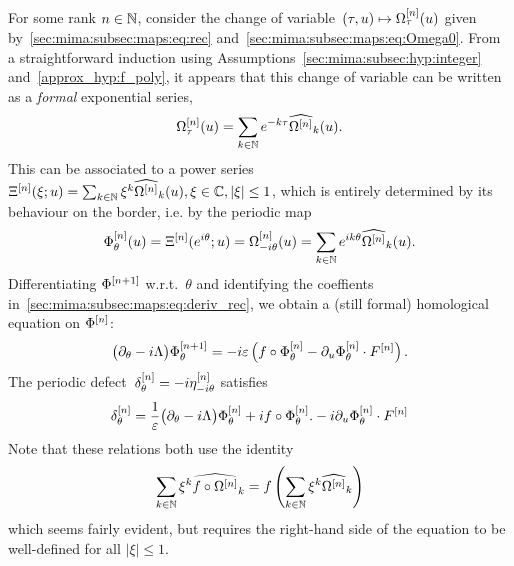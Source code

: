 For some rank $n\in \mathbb{N}$, consider the change of variable~$(\tau, u)
\mapsto \Omega^{[n]}_{\tau}(u)$ given
by~\eqref{sec:mima:subsec:maps:eq:rec}
and~\eqref{sec:mima:subsec:maps:eq:Omega0}. From a straightforward
induction using Assumptions~\ref{sec:mima:subsec:hyp:integer}
and~\ref{approx_hyp:f_poly}, it appears that this change of variable can
be written as a \textit{formal} exponential series, 
\begin{equation*}
	\Omega^{[n]}_{\tau}(u) = \sum_{k \in \mathbb{N}} e^{-k \tau}
  \widehat{\Omega^{[n]}}_k (u) . 
\end{equation*}
This can be associated to  a power series $\Xi^{[n]}(\xi ; u) = \sum_{k
\in \mathbb{N}} \xi^k \widehat{\Omega^{[n]}}_k(u), \xi \in \mathbb{C}, |\xi| \leq 1$,
which is entirely determined by its behaviour on the border, i.e. by the
periodic map
\begin{equation}
  \Phi^{[n]}_{\theta}(u) = \Xi^{[n]}(e^{i\theta}; u) 
  = \Omega^{[n]}_{-i\theta}(u)
  = \sum_{k \in \mathbb{N}} e^{ik\theta} \widehat{\Omega^{[n]}}_k (u) .
\end{equation}
Differentiating $\Phi^{[n+1]}$ w.r.t.~$\theta$ and identifying the
coeffients in~\eqref{sec:mima:subsec:maps:eq:deriv_rec}, we obtain a
(still formal) homological equation on $\Phi^{[n]}$:
\begin{equation}
  \big( \partial_{\theta} - i \Lambda \big) \Phi^{[n+1]}_{\theta}
  = -i \varepsilon \left( f \circ \Phi^{[n]}_{\theta} - \partial_{u} \Phi^{[n]}_{\theta}
  \cdot F^{[n]} \right) .
\end{equation}
The periodic defect~$\delta^{[n]}_{\theta} = -i \eta^{[n]}_{-i\theta}$ 
satisfies 
\begin{equation} \label{sec:proofs:subsec:bounds:eq:def_delta}
  \delta^{[n]}_{\theta} 
  = \frac{1}{\varepsilon} \big( \partial_{\theta} - i\Lambda \big) \Phi^{[n]}_{\theta} 
  + i f \circ \Phi^{[n]}_{\theta} . 
  - i \partial_{u} \Phi^{[n]}_{\theta} \cdot F^{[n]} 
\end{equation}
Note that these relations both use the identity 
\begin{equation} \label{sec:proofs:subsec:bounds:eq:commut_xi}
  \sum_{k \in \mathbb{N}} \xi^k \widehat{f \circ \Omega^{[n]}}_k 
  = f \left( \sum_{k \in \mathbb{N}} \xi^k \widehat{\Omega^{[n]}}_k 
    \right) 
\end{equation}
which seems fairly evident, but requires the right-hand side of the
equation to be well-defined for all $|\xi| \leq 1$.

%

